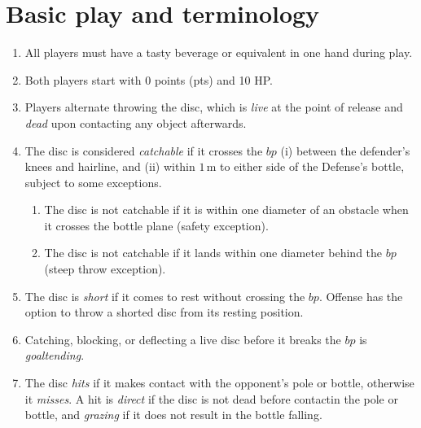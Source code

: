 \documentclass[11pt,letterpaper,twocolumn,english,DIV=calc]{scrartcl}
\begin{document}
\section{Basic play and terminology}
\begin{enumerate}
	\item All players must have a tasty beverage or equivalent in one hand during play.
	\item Both players start with 0 points (pts) and 10 HP.
	\item \label{enu:alternate_throws} Players alternate throwing the disc, which is \emph{live} at the point of release and \emph{dead} upon contacting any object afterwards.

	\item The disc is considered \emph{catchable} if it crosses the $bp$ (i) between the defender's knees and hairline, and (ii) within $1\,\mbox{m}$ to either side of the Defense's bottle, subject to some exceptions.
	\begin{enumerate}
		\item The disc is not catchable if it is within one diameter of an obstacle when it crosses the bottle plane (safety exception).
		\item The disc is not catchable if it lands within one diameter behind the $bp$ (steep throw exception).
	\end{enumerate}

	\item The disc is \emph{short} if it comes to rest without crossing the $bp$. 
		Offense has the option to throw a shorted disc from its resting position. 

	\item Catching, blocking, or deflecting a live disc before it breaks the $bp$ is \emph{goaltending}.
	
	\item The disc \emph{hits} if it makes contact with the opponent's pole or bottle, otherwise it \emph{misses}.
	A hit is \emph{direct} if the disc is not dead before contactin the pole or bottle, and \emph{grazing} if it does not result in the bottle falling.

\end{enumerate}
\end{document}
